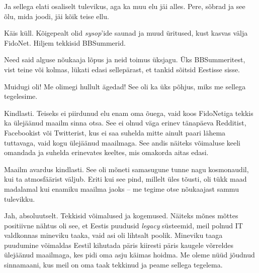 
Ja sellega elati osaliselt tulevikus, aga ka muu elu jäi alles. Pere, sõbrad ja see õlu, mida joodi, jäi kõik teise ellu.


Käis küll. Kõigepealt olid \emph{sysop}'ide saunad ja muud üritused, kust kasvas välja FidoNet. Hiljem tekkisid
BBSummerid.


Need said alguse nõukaaja lõpus ja neid toimus üksjagu. Üks 
BBSummeritest, vist teine või kolmas, lükati edasi sellepärast, et tankid sõitsid Eestisse 
sisse.


Muidugi oli! Me olimegi hullult ägedad! See oli ka üks põhjus, miks me sellega tegelesime.


Kindlasti. Teiseks ei piirdunud elu enam oma õuega, vaid koos FidoNetiga tekkis ka ülejäänud maailm sinna otsa. See ei 
olnud väga erinev tänapäeva Redditist, Facebookist või Twitterist, kus ei
saa suhelda mitte ainult paari lähema tuttavaga, vaid kogu ülejäänud 
maailmaga. See andis 
näiteks võimaluse keeli omandada ja suhelda erinevates keeltes, mis omakorda aitas edasi.


Maailm avardus kindlasti. See oli mõneti samasugune tunne nagu 
kosmonaudil, kui ta atmosfäärist väljub. Eriti kui see pind, millelt üles 
tõusti, oli tükk maad madalamal kui enamiku maailma jaoks -- me tegime
otse nõukaajast sammu tulevikku.


Jah, absoluutselt. Tekkisid võimalused ja kogemused. Näiteks mõnes mõttes 
positiivne nähtus oli see, et Eestis puudusid \emph{legacy} süsteemid, meil 
polnud IT valdkonnas mineviku taaka, vaid asi oli lihtsalt poolik. 
Mineviku taaga puudumine võimaldas Eestil kihutada päris kiiresti 
päris kaugele võrreldes ülejäänud maailmaga, kes pidi oma asju käimas hoidma. 
Me oleme nüüd jõudnud sinnamaani, kus meil on oma taak tekkinud ja peame 
sellega tegelema.

